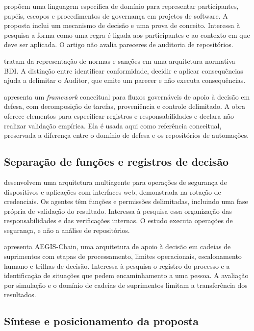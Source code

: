  propõem uma linguagem específica de domínio para representar participantes, papéis, escopos e procedimentos de governança em projetos de software. A proposta inclui um mecanismo de decisão e uma prova de conceito. Interessa à pesquisa a forma como uma regra é ligada aos participantes e ao contexto em que deve ser aplicada. O artigo não avalia pareceres de auditoria de repositórios.

 tratam da representação de normas e sanções em uma arquitetura normativa BDI. A distinção entre identificar conformidade, decidir e aplicar consequências ajuda a delimitar o Auditor, que emite um parecer e não executa consequências.

 apresenta um \textit{framework} conceitual para fluxos governáveis de apoio à decisão em defesa, com decomposição de tarefas, proveniência e controle delimitado. A obra oferece elementos para especificar registros e responsabilidades e declara não realizar validação empírica. Ela é usada aqui como referência conceitual, preservada a diferença entre o domínio de defesa e os repositórios de automações.

\subsection{Separação de funções e registros de decisão}
\label{rt-2-6-4}

 desenvolvem uma arquitetura multiagente para operações de segurança de dispositivos e aplicações com interfaces web, demonstrada na rotação de credenciais. Os agentes têm funções e permissões delimitadas, incluindo uma fase própria de validação do resultado. Interessa à pesquisa essa organização das responsabilidades e das verificações internas. O estudo executa operações de segurança, e não a análise de repositórios.

 apresenta AEGIS-Chain, uma arquitetura de apoio à decisão em cadeias de suprimentos com etapas de processamento, limites operacionais, escalonamento humano e trilhas de decisão. Interessa à pesquisa o registro do processo e a identificação de situações que pedem encaminhamento a uma pessoa. A avaliação por simulação e o domínio de cadeias de suprimentos limitam a transferência dos resultados.

\subsection{Síntese e posicionamento da proposta}
\label{rt-2-6-5}

